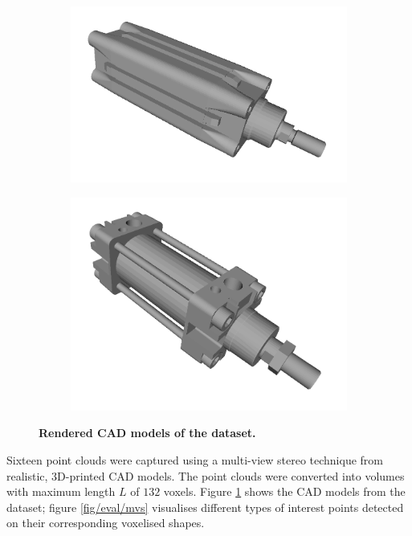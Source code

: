 \begin{figure}
\begin{subfigure}[t]{0.23\linewidth}
		\includegraphics[width=1\linewidth]{./fig/eval/toshiba_piston1.png}
	\end{subfigure}
	\begin{subfigure}[t]{0.23\linewidth} \centering
		\includegraphics[width=1\linewidth]{./fig/eval/toshiba_piston2.png}
	\end{subfigure}
	\caption{\textbf{Rendered CAD models of the \stereoset dataset.}} 
	\label{fig/eval/mvscad}
\end{figure}

Sixteen point clouds were captured using a multi-view stereo technique \cite{Vogiatzis2011} from realistic, 3D-printed CAD models. The point clouds were converted into volumes with maximum length $L$ of $132$ voxels. Figure \ref{fig/eval/mvscad} shows the CAD models from the \stereoset dataset; figure \ref{fig/eval/mvs} visualises different types of interest points detected on their corresponding voxelised shapes.

